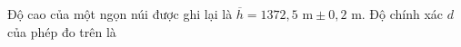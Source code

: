 \begin{ex}
Độ cao của một ngọn núi được ghi lại là $\overline h=1372{,}5\text{ m}\pm0{,}2\text{ m}$. Độ chính xác $d$ của phép đo trên là
\end{ex}
